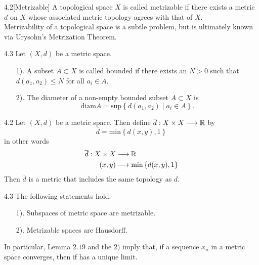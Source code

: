 \begin{customdefinition}{4.2}[Metrizable]
A topological space $X$ is called metrizable if there exists a metric $d$ on $X$ whose associated metric topology agrees with that of $X$.\\
Metrizability of a topological space is a subtle problem, but is ultimately known via Urysohn's Metrization Theorem.
\end{customdefinition}

\begin{customdefinition}{4.3}
Let $(X, d)$ be a metric space.
\begin{enumerate}
    \item[1).] A subset $A \subset X$ is called bounded if there exists an $N>0$ such that $d(a_1, a_2) \leqslant N$ for all $a_i \in A$.
    \item[2).] The diameter of a non-empty bounded subset $A\subset X$ is 
                $$\text{diam} A = \text{sup} \left\{d(a_1, a_2) \mid a_i \in A\right\}.$$
\end{enumerate}
\end{customdefinition}

\begin{customthm}{4.2}
Let $(X, d)$ be a metric space. Then define $\overline{d}: X\times X \longrightarrow \mathbb{R}$ by
    $$\overline{d} = \text{min} \left\{d(x,y), 1\right\}$$
in other words
    \begin{align*}
        \overline{d}: X\times X &\longrightarrow \mathbb{R}\\
        (x,y) &\longrightarrow \text{min} \left\{d(x,y), 1\right\}
    \end{align*}
Then $\overline{d}$ is a metric that includes the same topology as $d$.
\end{customthm}

\begin{customthm}{4.3}
The following statements hold.
\begin{enumerate}
    \item[1).] Subspaces of metric space are metrizable.
    \item[2).] Metrizable spaces are Hausdorff.
\end{enumerate}
In particular, Lemma $2.19$ and the $2)$ imply that, if a sequence $x_n$ in a metric space converges, then if has a unique limit.
\end{customthm}

